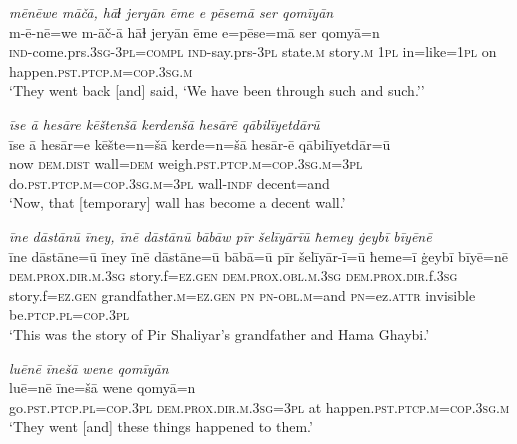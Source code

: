\ea \label{BP.202}
\textit{mēnēwe māčā, hāɫ jeryān ēme e pēsemā ser qomīyān} \\ 
\gll m-ē-nē=we m-āč-ā hāɫ jeryān ēme e=pēse=mā ser qomyā=n \\ 
 \textsc{ind-}come.prs\textsc{.3sg}\textsc{-3pl}\textsc{=compl} \textsc{ind-}say.prs\textsc{-3pl} state\textsc{.m} story\textsc{.m} \textsc{1pl} in=like\textsc{=\textsc{1pl}} on happen\textsc{.pst}\textsc{.ptcp}\textsc{.m}\textsc{=cop}\textsc{.3sg}\textsc{.m} \\ 
\glt `They went back [and] said, ‘We have been through such and such.’'
\z 
 
\ea \label{BP.204}
\textit{īse ā hesāre kēštenšā kerdenšā hesārē qābilīyetdārū} \\ 
\gll īse ā hesār=e kēšte=n=šā kerde=n=šā hesār-ē qābilīyetdār=ū \\ 
 now \textsc{dem.dist} wall\textsc{=dem} weigh\textsc{.pst}\textsc{.ptcp}\textsc{.m}\textsc{=cop}\textsc{.3sg}\textsc{.m}\textsc{=3pl} do\textsc{.pst}\textsc{.ptcp}\textsc{.m}\textsc{=cop}\textsc{.3sg}\textsc{.m}\textsc{=3pl} wall\textsc{-indf} decent=and \\ 
\glt `Now, that [temporary] wall has become a decent wall.'
\z 
 
\ea \label{BP.208}
\textit{īne dāstānū īney, īnē dāstānū bābāw pīr šelīyārīū ħemey ġeybī bīyēnē} \\ 
\gll īne dāstāne=ū īney īnē dāstāne=ū bābā=ū pīr šelīyār-ī=ū ħeme=ī ġeybī bīyē=nē \\ 
 \textsc{dem.prox}\textsc{.dir}\textsc{.m}\textsc{.3sg} story.f\textsc{=ez.gen} \textsc{dem.prox}\textsc{.obl}\textsc{.m}\textsc{.3sg} \textsc{dem.prox}\textsc{.dir}.f\textsc{.3sg} story.f\textsc{=ez.gen} grandfather\textsc{.m}\textsc{=ez.gen} \textsc{pn} \textsc{pn}\textsc{-obl}\textsc{.m}=and \textsc{pn}=ez.\textsc{attr} invisible be\textsc{.ptcp}\textsc{.pl}\textsc{=cop}\textsc{.3pl} \\ 
\glt `This was the story of Pir Shaliyar’s grandfather and Hama Ghaybi.'
\z 
 
\ea \label{BP.209}
\textit{luēnē īnešā wene qomīyān} \\ 
\gll luē=nē īne=šā wene qomyā=n \\ 
 go\textsc{.pst}\textsc{.ptcp}\textsc{.pl}\textsc{=cop}\textsc{.3pl} \textsc{dem.prox}\textsc{.dir}\textsc{.m}\textsc{.3sg}\textsc{=3pl} at happen\textsc{.pst}\textsc{.ptcp}\textsc{.m}\textsc{=cop}\textsc{.3sg}\textsc{.m} \\ 
\glt `They went [and] these things happened to them.'
\z 
 
